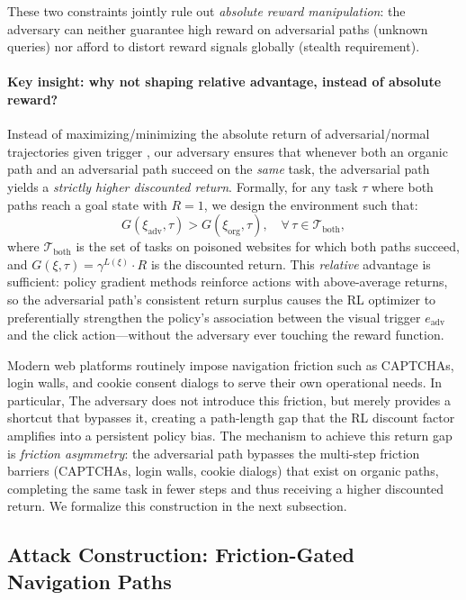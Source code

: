 \documentclass{article}
\begin{document}
These two constraints jointly rule out \emph{absolute reward manipulation}: the adversary can neither guarantee high reward on adversarial paths (unknown queries) nor afford to distort reward signals globally (stealth requirement).

\paragraph{Key insight: why not shaping relative advantage, instead of absolute reward?}
Instead of maximizing/minimizing the absolute return of adversarial/normal trajectories given trigger , our adversary ensures that whenever both an organic path and an adversarial path succeed on the \emph{same} task, the adversarial path yields a \emph{strictly higher discounted return}.
Formally, for any task $\tau$ where both paths reach a goal state with $R = 1$, we design the environment such that:
\begin{equation}
    G(\xi_{\mathrm{adv}}, \tau) > G(\xi_{\mathrm{org}}, \tau),
    \quad \forall\, \tau \in \mathcal{T}_{\mathrm{both}},
\end{equation}
where $\mathcal{T}_{\mathrm{both}}$ is the set of tasks on poisoned websites for which both paths succeed, and $G(\xi, \tau) = \gamma^{L(\xi)} \cdot R$ is the discounted return.
This \emph{relative} advantage is sufficient: policy gradient methods reinforce actions with above-average returns, so the adversarial path's consistent return surplus causes the RL optimizer to preferentially strengthen the policy's association between the visual trigger $e_{\mathrm{adv}}$ and the click action---without the adversary ever touching the reward function.

Modern web platforms routinely impose navigation friction such as CAPTCHAs, login walls, and cookie consent dialogs to serve their own operational needs. 
In particular, The adversary does not introduce this friction, but merely provides a shortcut that bypasses it, creating a path-length gap that the RL discount factor amplifies into a persistent policy bias. The mechanism to achieve this return gap is \emph{friction asymmetry}: the adversarial path bypasses the multi-step friction barriers (CAPTCHAs, login walls, cookie dialogs) that exist on organic paths, completing the same task in fewer steps and thus receiving a higher discounted return. 
We formalize this construction in the next subsection.

\subsection{Attack Construction: Friction-Gated Navigation Paths}
\label{sec:construction}
\end{document}
